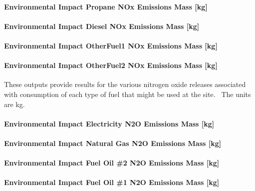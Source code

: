 \paragraph{Environmental Impact Propane NOx Emissions Mass {[}kg{]}}\label{environmental-impact-propane-nox-emissions-mass-kg}

\paragraph{Environmental Impact Diesel NOx Emissions Mass {[}kg{]}}\label{environmental-impact-diesel-nox-emissions-mass-kg}

\paragraph{Environmental Impact OtherFuel1 NOx Emissions Mass {[}kg{]}}\label{environmental-impact-otherfuel1-nox-emissions-mass-kg}

\paragraph{Environmental Impact OtherFuel2 NOx Emissions Mass {[}kg{]}}\label{environmental-impact-otherfuel2-nox-emissions-mass-kg}

These outputs provide results for the various nitrogen oxide releases associated with consumption of each type of fuel that might be used at the site.~ The units are kg.

\paragraph{Environmental Impact Electricity N2O Emissions Mass {[}kg{]}}\label{environmental-impact-electricity-n2o-emissions-mass-kg}

\paragraph{Environmental Impact Natural Gas N2O Emissions Mass {[}kg{]}}\label{environmental-impact-natural-gas-n2o-emissions-mass-kg}

\paragraph{Environmental Impact Fuel Oil \#2 N2O Emissions Mass {[}kg{]}}\label{environmental-impact-fuel-oil-2-n2o-emissions-mass-kg}

\paragraph{Environmental Impact Fuel Oil \#1 N2O Emissions Mass {[}kg{]}}\label{environmental-impact-fuel-oil-1-n2o-emissions-mass-kg}

